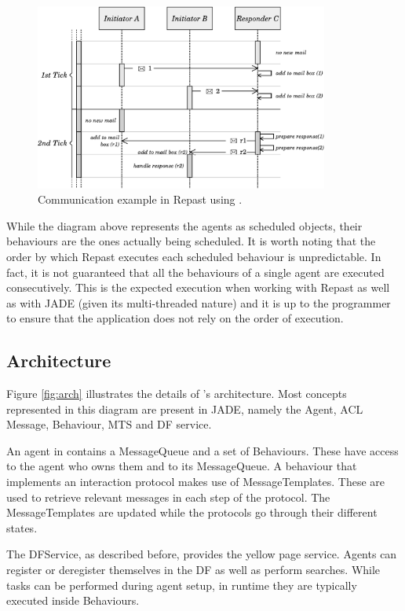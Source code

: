 \begin{figure}[h]
	\centering
	\includegraphics[width=3.8in]{figures/tickExample.pdf}
	\caption{
		Communication example in Repast using \apiname{}.
	}
	\label{fig:com-example-repast}
\end{figure}

While the diagram above represents the agents as scheduled objects, their behaviours are the ones actually being scheduled. It is worth noting that the order by which Repast executes each scheduled behaviour is unpredictable. In fact, it is not guaranteed that all the behaviours of a single agent are executed consecutively. This is the expected execution when working with Repast as well as with JADE (given its multi-threaded nature) and it is up to the programmer to ensure that the application does not rely on the order of execution.

\subsection{Architecture}

Figure \ref{fig:arch} illustrates the details of \apiname{}'s architecture. Most concepts represented in this diagram are present in JADE, namely the Agent, ACL Message, Behaviour, MTS and DF service.

An agent in \apiname{} contains a MessageQueue and a set of Behaviours. These have access to the agent who owns them and to its MessageQueue. A behaviour that implements an interaction protocol makes use of MessageTemplates. These are used to retrieve relevant messages in each step of the protocol. The MessageTemplates are updated while the protocols go through their different states.

The DFService, as described before, provides the yellow page service. Agents can register or deregister themselves in the DF as well as perform searches. While tasks can be performed during agent setup, in runtime they are typically executed inside Behaviours.

